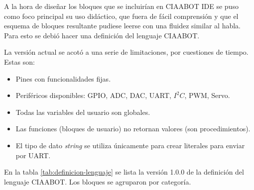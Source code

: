 A la hora de diseñar los bloques que se incluirían en CIAABOT IDE se puso como foco principal su uso didáctico, que fuera de fácil comprensión y que el esquema de bloques resultante pudiese leerse con una fluidez similar al habla. Para esto se debió hacer una definición del lenguaje CIAABOT.

La versión actual se acotó a una serie de limitaciones, por cuestiones de tiempo. Estas son:
\begin{itemize}
\item Pines con funcionalidades fijas.
\item Periféricos disponibles: GPIO, ADC, DAC, UART, $I^2C$, PWM, Servo.
\item Todas las variables del usuario son globales.
\item Las funciones (bloques de usuario) no retornan valores (son procedimientos).
\item El tipo de dato \emph{string} se utiliza únicamente para crear literales para enviar por UART.
\end{itemize}

En la tabla \ref{tab:definicion-lenguaje} se lista la versión 1.0.0 de la definición del lenguaje CIAABOT. Los bloques se agruparon por categoría.

